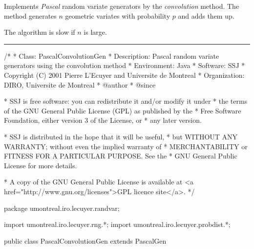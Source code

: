 
Implements \emph{Pascal} random variate generators by
the \emph{convolution} method.
The method generates $n$ geometric variates with probability $p$
and adds them up.

The algorithm is slow if $n$ is large.


\bigskip\hrule


\begin{code}
\begin{hide}
/*
 * Class:        PascalConvolutionGen
 * Description:  Pascal random variate generators using the convolution method
 * Environment:  Java
 * Software:     SSJ 
 * Copyright (C) 2001  Pierre L'Ecuyer and Universite de Montreal
 * Organization: DIRO, Universite de Montreal
 * @author       
 * @since

 * SSJ is free software: you can redistribute it and/or modify it under
 * the terms of the GNU General Public License (GPL) as published by the
 * Free Software Foundation, either version 3 of the License, or
 * any later version.

 * SSJ is distributed in the hope that it will be useful,
 * but WITHOUT ANY WARRANTY; without even the implied warranty of
 * MERCHANTABILITY or FITNESS FOR A PARTICULAR PURPOSE.  See the
 * GNU General Public License for more details.

 * A copy of the GNU General Public License is available at
   <a href="http://www.gnu.org/licenses">GPL licence site</a>.
 */
\end{hide}
package umontreal.iro.lecuyer.randvar;\begin{hide}
import umontreal.iro.lecuyer.rng.*;
import umontreal.iro.lecuyer.probdist.*;
\end{hide}

public class PascalConvolutionGen extends PascalGen \begin{hide} {
\end{hide}
\end{code}

